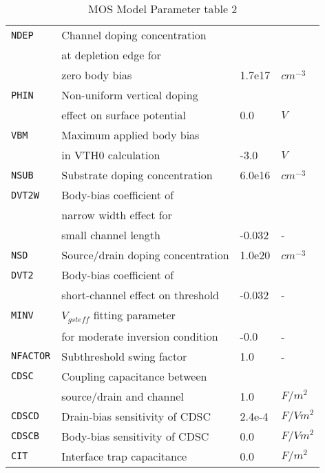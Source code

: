 \documentclass{article}
\begin{document}
\begin{table}[H]
\begin{tabular}{|l| l| l| l|}
\texttt{NDEP} & Channel doping concentration & & \\
              & at depletion edge for & & \\
              & zero body bias & 1.7e17 & $cm^{-3}$\\
\texttt{PHIN} & Non-uniform vertical doping & & \\
              & effect on surface potential & 0.0 & $V$\\
\texttt{VBM} & Maximum applied body bias & & \\
             & in VTH0 calculation & -3.0 & $V$\\
\texttt{NSUB} & Substrate doping concentration & 6.0e16 & $cm^{-3}$\\
\texttt{DVT2W} & Body-bias coefficient of & & \\
               & narrow width effect for & & \\
               & small channel length & -0.032 & - \\
\texttt{NSD} & Source/drain doping concentration & 1.0e20 & $cm^{-3}$\\
\texttt{DVT2} & Body-bias coefficient of & & \\
              & short-channel effect on threshold & -0.032 & -\\
\texttt{MINV} & $V_{gsteff}$ fitting parameter & & \\
              & for moderate inversion condition & -0.0 & - \\
\texttt{NFACTOR} & Subthreshold swing factor & 1.0 & - \\
\texttt{CDSC} & Coupling capacitance between & & \\
              & source/drain and channel & 1.0 & $F/m^2$\\
\texttt{CDSCD} & Drain-bias sensitivity of CDSC & 2.4e-4 & $F/Vm^2$\\
\texttt{CDSCB} & Body-bias sensitivity of CDSC & 0.0 & $F/Vm^2$\\
\texttt{CIT} & Interface trap capacitance & 0.0 & $F/m^2$\\
\hline
\end{tabular}
\caption{\label{bsim4.params2} MOS Model Parameter table 2}
\end{table}
\end{document}
